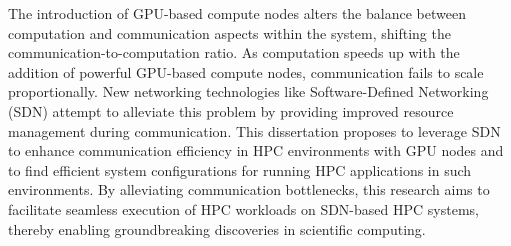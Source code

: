 The introduction of
GPU-based compute nodes
alters the balance between computation and communication aspects within the
system, shifting the communication-to-computation ratio.
As computation speeds up with the addition of powerful GPU-based compute
nodes, communication fails to scale proportionally. New networking
technologies like Software-Defined Networking (SDN) attempt to alleviate
this problem by providing
improved resource management during communication.
This dissertation proposes to leverage SDN to enhance
communication efficiency in HPC environments with GPU nodes
and to find efficient system configurations for running
HPC applications in such environments. By alleviating communication
bottlenecks, this research aims to facilitate seamless execution of HPC
workloads on SDN-based HPC systems, thereby enabling groundbreaking discoveries in scientific computing.
